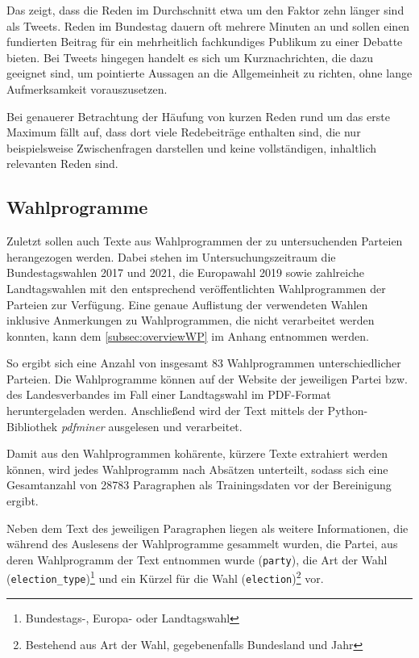 Das zeigt, dass die Reden im Durchschnitt etwa um den Faktor zehn länger sind als Tweets. Reden im Bundestag dauern oft mehrere Minuten an und sollen einen fundierten Beitrag für ein mehrheitlich fachkundiges Publikum zu einer Debatte bieten. Bei Tweets hingegen handelt es sich um Kurznachrichten, die dazu geeignet sind, um pointierte Aussagen an die Allgemeinheit zu richten, ohne lange Aufmerksamkeit vorauszusetzen.

Bei genauerer Betrachtung der Häufung von kurzen Reden rund um das erste Maximum fällt auf, dass dort viele Redebeiträge enthalten sind, die nur beispielsweise Zwischenfragen darstellen und keine vollständigen, inhaltlich relevanten Reden sind.


\subsection*{Wahlprogramme}

Zuletzt sollen auch Texte aus Wahlprogrammen der zu untersuchenden Parteien herangezogen werden. Dabei stehen im Untersuchungszeitraum die Bundestagswahlen \num{2017} und \num{2021}, die Europawahl 2019 sowie zahlreiche Landtagswahlen mit den entsprechend veröffentlichten Wahlprogrammen der Parteien zur Verfügung. Eine genaue Auflistung der verwendeten Wahlen inklusive Anmerkungen zu Wahlprogrammen, die nicht verarbeitet werden konnten, kann dem \autoref{subsec:overviewWP} im Anhang entnommen werden.

So ergibt sich eine Anzahl von insgesamt \num{83} Wahlprogrammen unterschiedlicher Parteien. Die Wahlprogramme können auf der Website der jeweiligen Partei bzw. des Landesverbandes im Fall einer Landtagswahl im \ac{PDF}-Format heruntergeladen werden. Anschließend wird der Text mittels der Python-Bibliothek \textit{pdfminer} ausgelesen und verarbeitet.

Damit aus den Wahlprogrammen kohärente, kürzere Texte extrahiert werden können, wird jedes Wahlprogramm nach Absätzen unterteilt, sodass sich eine Gesamtanzahl von \num{28783} Paragraphen als Trainingsdaten vor der Bereinigung ergibt.

Neben dem Text des jeweiligen Paragraphen liegen als weitere Informationen, die während des Auslesens der Wahlprogramme gesammelt wurden, die Partei, aus deren Wahlprogramm der Text entnommen wurde (\texttt{party}), die Art der Wahl (\texttt{election\_type})\footnote{Bundestags-, Europa- oder Landtagswahl} und ein Kürzel für die Wahl (\texttt{election})\footnote{Bestehend aus Art der Wahl, gegebenenfalls Bundesland und Jahr} vor.

